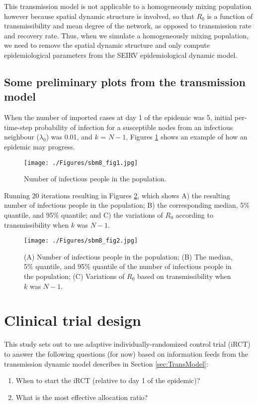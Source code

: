 \documentclass[a4paper]{article}
\begin{document}
	This transmission model is not applicable to a homogeneously mixing population however because spatial dynamic structure is involved, so that $R_0$ is a function of transmissibility and mean degree of the network, as opposed to transmission rate and recovery rate. Thus, when we simulate a homogeneously mixing population, we need to remove the spatial dynamic structure and only compute epidemiological parameters from the SEIRV epidemiological dynamic model.
	
	\subsection{Some preliminary plots from the transmission model}
	When the number of imported cases at day 1 of the epidemic was 5, initial per-time-step probability of infection for a susceptible nodes from an infectious neighbour ($\lambda_0$) was 0.01, and $k$ = $N-1$, Figures \ref{fig:seirv} shows an example of how an epidemic may progress.
	\begin{figure}[!ht]
	    \begin{center}	
			\texttt{[image: ./Figures/sbm8\_fig1.jpg]} 
		\end{center}
		\caption[Number of infectious people in the population]{Number of infectious people in the population.}
		\label{fig:seirv}
	\end{figure}
		  
Running 20 iterations resulting in Figures \ref{fig:transmodel1}, which shows A) the resulting number of infectious people in the population; B) the corresponding median, 5\% quantile, and 95\% quantile; and C) the variations of $R_0$ according to transmissibility when $k$ was $N-1$. 	    
	\begin{figure}[!ht]
		\begin{center}	
			\texttt{[image: ./Figures/sbm8\_fig2.jpg]} 
		\end{center}
	\caption[Number of infectious people in the population]{(A) Number of infectious people in the population; (B) The median, 5\% quantile, and 95\% quantile of the number of infectious people in the population; (C) Variations of $R_0$ based on transmissibility when $k$ was $N-1$.}
	\label{fig:transmodel1}
	\end{figure}
		
	\newpage
	\section{Clinical trial design}
	\label{sec:TrialDesign}
	This study sets out to use adaptive individually-randomized control trial (iRCT) to answer the following questions (for now) based on information feeds from the transmission dynamic model describes in Section \ref{sec:TransModel}:
	\begin{enumerate}
		\item When to start the iRCT (relative to day 1 of the epidemic)?
		\item What is the most effective allocation ratio?
	\end{enumerate}
	
\end{document}
